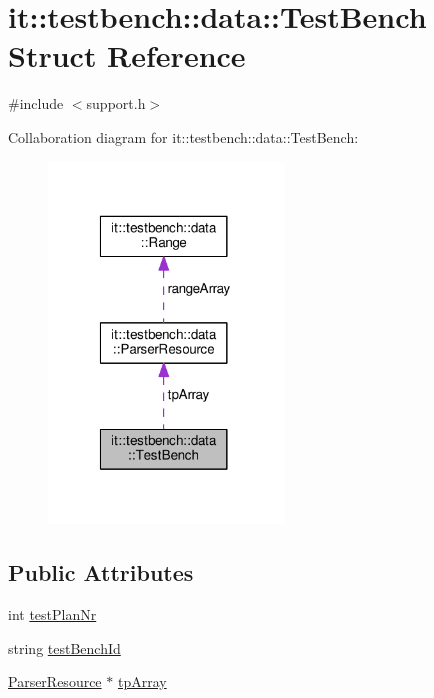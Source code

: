 \hypertarget{structit_1_1testbench_1_1data_1_1TestBench}{\section{it\-:\-:testbench\-:\-:data\-:\-:Test\-Bench Struct Reference}
\label{d4/d85/structit_1_1testbench_1_1data_1_1TestBench}
}


{\ttfamily \#include $<$support.\-h$>$}



Collaboration diagram for it\-:\-:testbench\-:\-:data\-:\-:Test\-Bench\-:
\nopagebreak
\begin{figure}[H]
\begin{center}
\leavevmode
\includegraphics[width=178pt]{da/d90/structit_1_1testbench_1_1data_1_1TestBench__coll__graph}
\end{center}
\end{figure}
\subsection*{Public Attributes}
\begin{DoxyCompactItemize}
\item 
int \hyperlink{structit_1_1testbench_1_1data_1_1TestBench_ad04af24bef55a0e3c41a3c856da57190}{test\-Plan\-Nr}
\item 
string \hyperlink{structit_1_1testbench_1_1data_1_1TestBench_ad0fe47994f2f80cf9d3aa2fa5189a0b9}{test\-Bench\-Id}
\item 
\hyperlink{structit_1_1testbench_1_1data_1_1ParserResource}{Parser\-Resource} $\ast$ \hyperlink{structit_1_1testbench_1_1data_1_1TestBench_a056b9bf182af95a7ddc6e0f1fd1a0649}{tp\-Array}
\end{DoxyCompactItemize}


